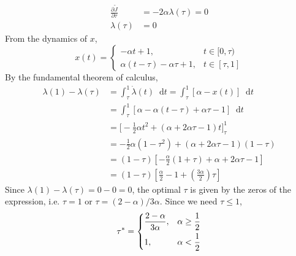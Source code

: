 \documentclass[letterpaper,11pt,titlepage]{article}
\newcommand*\dif{\mathop{}\!\mathrm{d}}
\newcommand*\pder[2]{\frac{\partial #1}{\partial #2}}
\begin{document}
\begin{enumerate}[leftmargin=0pt]
\begin{enumerate}
\begin{align}
      \pder{\tilde J}{\tau} &= -2\alpha\lambda(\tau) = 0 \\
      \lambda(\tau) &= 0
    \end{align}
    From the dynamics of $x$,
    \[
      x(t) = \begin{cases}
        -\alpha t + 1, & t\in[0,\tau) \\
        \alpha (t-\tau) - \alpha \tau + 1, & t\in[\tau,1]
      \end{cases}
    \]
    By the fundamental theorem of calculus,
    \begin{align}
      \lambda(1)-\lambda(\tau) &= \int_\tau^1\! \dot\lambda(t)\dif t = \int_\tau^1\! [\alpha-x(t)] \dif t \\
                               &= \int_\tau^1\! [\alpha - \alpha(t-\tau) + \alpha\tau - 1] \dif t \\
                               &= \bigg[ -\frac{1}{2} \alpha t^2 + (\alpha+2\alpha\tau-1)t \bigg]_\tau^1 \\
                               &= -\frac{1}{2} \alpha (1-\tau^2) + (\alpha+2\alpha\tau-1)(1-\tau) \\
                               &= (1-\tau) \left[ -\frac{\alpha}{2}(1+\tau) + \alpha + 2\alpha\tau - 1 \right] \\
                               &= (1-\tau) \left[ \frac{\alpha}{2} - 1 + \left( \frac{3\alpha}{2} \right) \tau \right]
    \end{align}
    Since $\lambda(1)-\lambda(\tau)=0-0=0$, the optimal $\tau$ is given by the zeros of the expression, i.e. $\tau=1$ or $\tau=(2-\alpha)/3\alpha$. Since we need $\tau\le1$,
    \[
      \tau^* = \begin{dcases}
        \frac{2-\alpha}{3\alpha}, & \alpha\ge\frac{1}{2} \\
        1, & \alpha < \frac{1}{2}
      \end{dcases}
    \]


\end{enumerate}
\end{enumerate}
\end{document}
